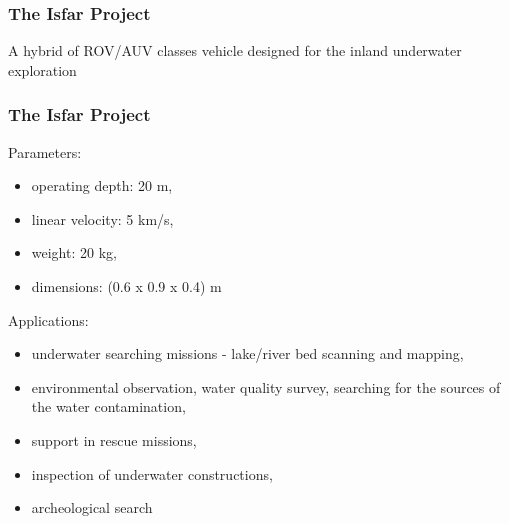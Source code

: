 \documentclass[t,compress]{beamer}
\begin{document}

\begin{frame}
	\frametitle{The Isfar Project}
	\begin{center} A hybrid of ROV/AUV classes vehicle designed for the inland underwater exploration
     \end{center}
\end{frame}

\begin{frame}
	\frametitle{The Isfar Project}
	Parameters:\\
	\begin{itemize}
		\item operating depth: 20 m,
		\item linear velocity: 5 km/s,
		\item weight: 20 kg,
		\item dimensions: (0.6 x 0.9 x 0.4) m
	\end{itemize}
	Applications:\\
	\begin{itemize}
		\item underwater searching missions - lake/river bed scanning and mapping,
		\item environmental observation, water quality survey, searching for the sources of the water contamination,
		\item support in rescue missions,
		\item inspection of underwater constructions,
		\item archeological search
	\end{itemize}
	\movie[]{}{}
\end{frame}
	
\end{document}
